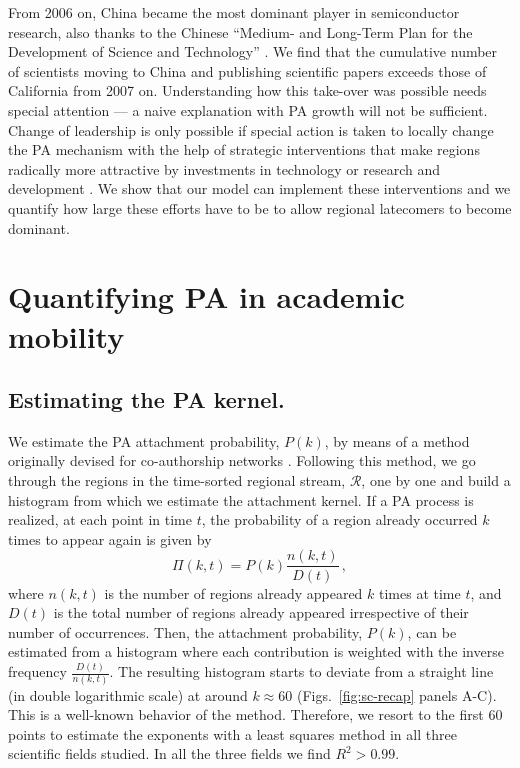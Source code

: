 \documentclass[draft,final]{vutinfth} %
\begin{document}
From 2006 on, China became the most dominant player in semiconductor research, also thanks to the Chinese ``Me\-dium- and Long-Term Plan for the Development of Science and Technology'' \cite{Lazonick12}. We find that the cumulative number of scientists moving to China and publishing scientific papers exceeds those of California from 2007 on. 
Understanding how this take-over was possible needs special attention –– a naive explanation with PA growth will not be sufficient. Change of leadership is only possible if special action is taken to locally change the PA mechanism with the help of strategic interventions that make regions radically more attractive by investments in technology \cite{Li21} or research and development \cite{tollefson18}. We show that our model can implement these interventions and we quantify how large these efforts have to be to allow regional latecomers to become dominant.

\section{Quantifying PA in academic mobility}
\label{sec:methods}

\subsection{Estimating the PA kernel.}
We estimate the PA attachment probability, $P(k)$, by means of a method originally devised for co-authorship networks \cite{Newman01}. Following this method, we go through the regions in the time-sorted regional stream, $\mathcal{R}$, one by one and build a histogram from which we  estimate the attachment kernel. If a PA process is realized, at each point in time $t$, the probability of a region already occurred $k$ times to appear again is given by
%
\begin{equation}
    \Pi(k,t) = P(k) \frac{n(k,t)}{D(t)} \, , 
\end{equation}
%
where $n(k,t)$ is the number of regions  already appeared $k$ times at time $t$, and $D(t)$ is the total number of regions already appeared irrespective of their number of occurrences. Then, the attachment probability, $P(k)$, can be estimated from a histogram where each contribution is weighted with the inverse frequency  $\frac{D(t)}{n(k,t)}$. The resulting histogram starts to deviate from a straight line (in double logarithmic scale) at around $k\approx60$ (Figs.~\ref{fig:sc-recap} panels A-C). 
This is a well-known behavior of the method. Therefore, we resort to the first 60 points to estimate the exponents with a least squares method in all three scientific fields studied.
In all the three fields we find $R^2 > 0.99$.
\end{document}
